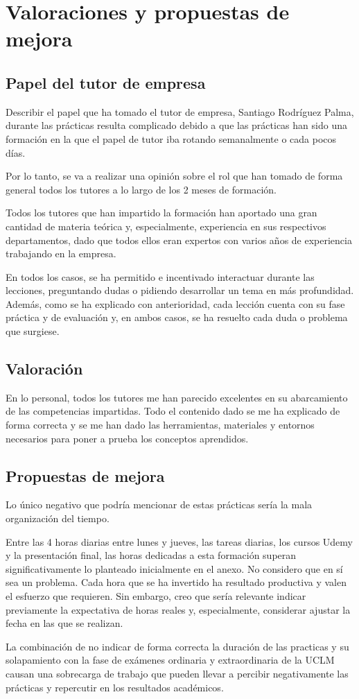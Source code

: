 \chapter{Valoraciones y propuestas de mejora}
\label{ch:opinion_conclusión}

\section{Papel del tutor de empresa}
\label{sec:rolTutor}
Describir el papel que ha tomado el tutor de empresa, Santiago Rodríguez Palma, durante las prácticas resulta complicado debido a que las prácticas han sido una formación en la que el papel de tutor iba rotando semanalmente o cada pocos días.

Por lo tanto, se va a realizar una opinión sobre el rol que han tomado de forma general todos los tutores a lo largo de los 2 meses de formación.

Todos los tutores que han impartido la formación han aportado una gran cantidad de materia teórica y, especialmente, experiencia en sus respectivos departamentos, dado que todos ellos eran expertos con varios años de experiencia trabajando en la empresa.

En todos los casos, se ha permitido e incentivado interactuar durante las lecciones, preguntando dudas o pidiendo desarrollar un tema en más profundidad. Además, como se ha explicado con anterioridad, cada lección cuenta con su fase práctica y de evaluación y, en ambos casos, se ha resuelto cada duda o problema que surgiese.


\section{Valoración}
\label{sec:valoracion}
En lo personal, todos los tutores me han parecido excelentes en su abarcamiento de las competencias impartidas. Todo el contenido dado se me ha explicado de forma correcta y se me han dado las herramientas, materiales y entornos necesarios para poner a prueba los conceptos aprendidos.

\section{Propuestas de mejora}
\label{sec:improvements}

Lo único negativo que podría mencionar de estas prácticas sería la mala organización del tiempo.

Entre las 4 horas diarias entre lunes y jueves, las tareas diarias, los cursos Udemy y la presentación final, las horas dedicadas a esta formación superan significativamente lo planteado inicialmente en el anexo. No considero que en sí sea un problema. Cada hora que se ha invertido ha resultado productiva y valen el esfuerzo que requieren. Sin embargo, creo que sería relevante indicar previamente la expectativa de horas reales y, especialmente, considerar ajustar la fecha en las que se realizan.

La combinación de no indicar de forma correcta la duración de las practicas y su solapamiento con la fase de exámenes ordinaria y extraordinaria de la UCLM causan una sobrecarga de trabajo que pueden llevar a percibir negativamente las prácticas y repercutir en los resultados académicos.

